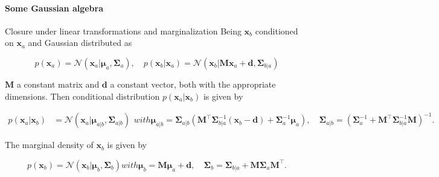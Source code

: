 \begin{frame}{\insertsection}
	\framesubtitle{Some Gaussian algebra}

	\begin{block}{Closure under linear transformations and marginalization}
		Being $\mathbf{x}_b$ conditioned on $\mathbf{x}_a$ and Gaussian distributed as

    \begin{equation*}
      p\left(\mathbf{x}_{a}\right)=\mathcal{N}\left(\mathbf{x}_{a} | \boldsymbol{\mu}_{a}, \boldsymbol{\Sigma}_{a}\right), \quad p\left(\mathbf{x}_{b} | \mathbf{x}_{a}\right)=\mathcal{N}\left(\mathbf{x}_{b} | \mathbf{M} \mathbf{x}_{a}+\mathbf{d}, \boldsymbol{\Sigma}_{b | a}\right)
    \end{equation*}

     $\mathbf{M}$ a constant matrix and $\mathbf{d}$ a constant vector, both with the appropriate dimensions. Then conditional distribution $p(\mathbf{x}_a|\mathbf{x}_b)$ is given by

    \begin{subequations}
    
    \begin{align*}
      p\left(\mathbf{x}_{a} | \mathbf{x}_{b}\right)&=\mathcal{N}\left(\mathbf{x}_{a} | \boldsymbol{\mu}_{a | b}, \boldsymbol{\Sigma}_{a | b}\right)
    \end{align*}
    with
    \begin{equation*}
        \boldsymbol{\mu}_{a | b}=\boldsymbol{\Sigma}_{a | b}\left(\mathbf{M}^\top \boldsymbol{\Sigma}_{b | a}^{-1}\left(\mathbf{x}_{b}-\mathbf{d}\right)+\boldsymbol{\Sigma}_{a}^{-1} \boldsymbol{\mu}_{a}\right), \quad \boldsymbol{\Sigma}_{a | b}=\left(\boldsymbol{\Sigma}_{a}^{-1}+\mathbf{M}^\top \boldsymbol{\Sigma}_{b | a}^{-1} \mathbf{M}\right)^{-1}.
    \end{equation*}
  	\end{subequations}
	
	The marginal density of $\mathbf{x}_b$ is given by

	\begin{subequations}
		\begin{equation*}
		p\left(\mathbf{x}_{b}\right)=\mathcal{N}\left(\mathbf{x}_{b} | \boldsymbol{\mu}_{b}, \boldsymbol{\Sigma}_{b}\right)
		\end{equation*}
		with
		\begin{equation*}
		\boldsymbol{\mu}_{b} =\mathbf{M} \boldsymbol{\mu}_{a}+\mathbf{d} , \quad \boldsymbol{\Sigma}_{b} =\boldsymbol{\Sigma}_{b | a}+\mathbf{M} \boldsymbol{\Sigma}_{a} \mathbf{M}^\top .
		\end{equation*}
	\end{subequations}
	\end{block}	
\end{frame}

